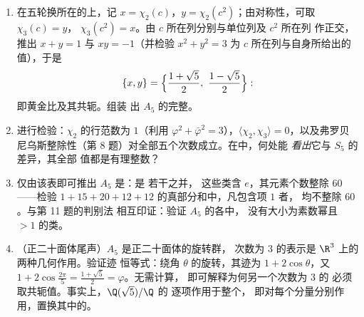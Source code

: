 \begin{problem}
\begin{enumerate}[resume]
        $\chi_2(g) = \chi_3(g) = -1$，
        在三轮换上为 $0$。
  \item 在五轮换所在的上，记 $x = \chi_2(c)$，$y =
        \chi_2(c^2)$；由对称性，可取 $\chi_3(c) = y$，
        $\chi_3(c^2) = x$。由 $c$ 所在列分别与单位列及 $c^2$ 所在列
        作正交，推出
        $x + y = 1$ 与 $xy = -1$（并检验 $x^2 +
        y^2 = 3$ 为 $c$ 所在列与自身所给出的值），于是
        \[
        \{x, y\} = \Bigl\{\frac{1 + \sqrt5}2,\ \frac{1 -
        \sqrt5}2\Bigr\} :
        \]
        即黄金比及其共轭。组装
        出 $A_5$ 的完整。
  \item 进行检验：$\chi_2$ 的行范数为 $1$（利用
        $\varphi^2 + \bar\varphi^2 = 3$），$\langle\chi_2,
        \chi_3\rangle = 0$，以及弗罗贝尼乌斯整除性（第
        8 题）对全部五个次数成立。在中，何处能
        \emph{看出}它与 $S_5$ 的差异，其全部
        值都是有理整数？
  \item 仅由该表即可推出 $A_5$ 是：是
        若干之并，
        这些类含 $e$，其元素个数整除 $60$——检验
        $1 + 15 + 20 + 12 + 12$ 的真部分和中，凡包含项 $1$ 者，
        均不整除 $60$。与第 11 题的判别法
        相互印证：验证 $A_5$ 的各中，
        没有大小为素数幂且 $> 1$ 的类。
  \item （正二十面体尾声）$A_5$ 是正二十面体的旋转群，
        次数为 $3$ 的表示是
        $\R^3$ 上的两种几何作用。验证迹
        恒等式：绕角 $\theta$ 的旋转，其迹为 $1 +
        2\cos\theta$，又 $1 + 2\cos\frac{2\pi}5 =
        \frac{1+\sqrt5}2 = \varphi$。无需计算，
        即可解释为何另一个次数为 $3$ 的
        必须取共轭值。事实上，$\Q(\sqrt5)/\Q$ 的
        逐项作用于整个，
        即对每个分量分别作用，置换其中的。
\end{enumerate}


\end{problem}
